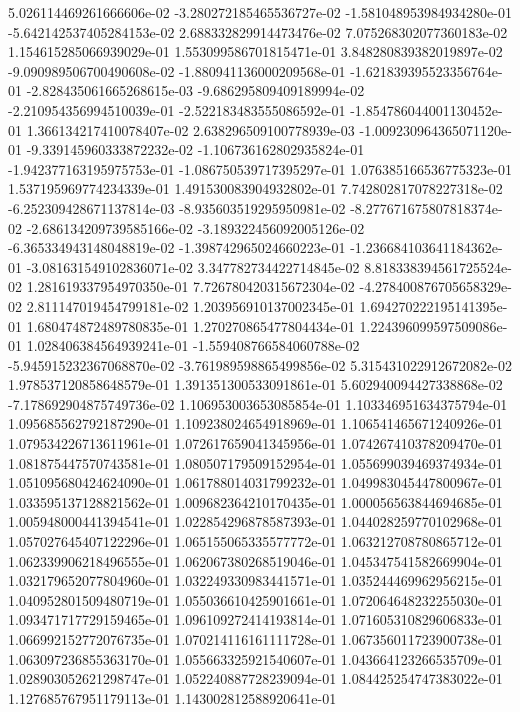 5.026114469261666606e-02
-3.280272185465536727e-02
-1.581048953984934280e-01
-5.642142537405284153e-02
2.688332829914473476e-02
7.075268302077360183e-02
1.154615285066939029e-01
1.553099586701815471e-01
3.848280839382019897e-02
-9.090989506700490608e-02
-1.880941136000209568e-01
-1.621839395523356764e-01
-2.828435061665268615e-03
-9.686295809409189994e-02
-2.210954356994510039e-01
-2.522183483555086592e-01
-1.854786044001130452e-01
1.366134217410078407e-02
2.638296509100778939e-03
-1.009230964365071120e-01
-9.339145960333872232e-02
-1.106736162802935824e-01
-1.942377163195975753e-01
-1.086750539717395297e-01
1.076385166536775323e-01
1.537195969774234339e-01
1.491530083904932802e-01
7.742802817078227318e-02
-6.252309428671137814e-03
-8.935603519295950981e-02
-8.277671675807818374e-02
-2.686134209739585166e-02
-3.189322456092005126e-02
-6.365334943148048819e-02
-1.398742965024660223e-01
-1.236684103641184362e-01
-3.081631549102836071e-02
3.347782734422714845e-02
8.818338394561725524e-02
1.281619337954970350e-01
7.726780420315672304e-02
-4.278400876705658329e-02
2.811147019454799181e-02
1.203956910137002345e-01
1.694270222195141395e-01
1.680474872489780835e-01
1.270270865477804434e-01
1.224396099597509086e-01
1.028406384564939241e-01
-1.559408766584060788e-02
-5.945915232367068870e-02
-3.761989598865499856e-02
5.315431022912672082e-02
1.978537120858648579e-01
1.391351300533091861e-01
5.602940094427338868e-02
-7.178692904875749736e-02
1.106953003653085854e-01
1.103346951634375794e-01
1.095685562792187290e-01
1.109238024654918969e-01
1.106541465671240926e-01
1.079534226713611961e-01
1.072617659041345956e-01
1.074267410378209470e-01
1.081875447570743581e-01
1.080507179509152954e-01
1.055699039469374934e-01
1.051095680424624090e-01
1.061788014031799232e-01
1.049983045447800967e-01
1.033595137128821562e-01
1.009682364210170435e-01
1.000056563844694685e-01
1.005948000441394541e-01
1.022854296878587393e-01
1.044028259770102968e-01
1.057027645407122296e-01
1.065155065335577772e-01
1.063212708780865712e-01
1.062339906218496555e-01
1.062067380268519046e-01
1.045347541582669904e-01
1.032179652077804960e-01
1.032249330983441571e-01
1.035244469962956215e-01
1.040952801509480719e-01
1.055036610425901661e-01
1.072064648232255030e-01
1.093471717729159465e-01
1.096109272414193814e-01
1.071605310829606833e-01
1.066992152772076735e-01
1.070214116161111728e-01
1.067356011723900738e-01
1.063097236855363170e-01
1.055663325921540607e-01
1.043664123266535709e-01
1.028903052621298747e-01
1.052240887728239094e-01
1.084425254747383022e-01
1.127685767951179113e-01
1.143002812588920641e-01
